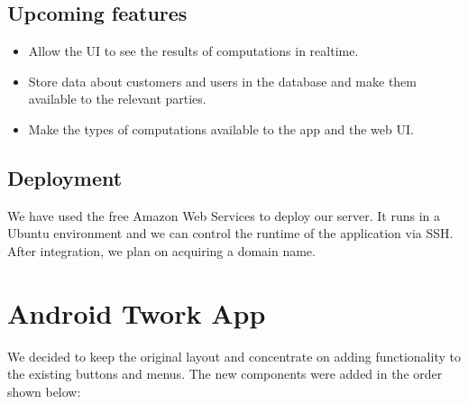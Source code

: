 \documentclass[a4paper,10pt]{article}
\begin{document}
\subsection{Upcoming features}

\begin{itemize}
\item Allow the UI to see the results of computations in realtime.
\item Store data about customers and users  in the database and make them available to the relevant parties.
\item Make the types of computations available to the app and the web UI.
\end{itemize}

\subsection{Deployment}
We have used the free Amazon Web Services to deploy our server. It runs in a Ubuntu environment and we can control the runtime of the application via SSH.
After integration, we plan on acquiring a domain name.




\section{Android Twork App}


We decided to keep the original layout and concentrate on adding functionality to the existing buttons and menus. The new components were added in the order shown below:
\end{document}
